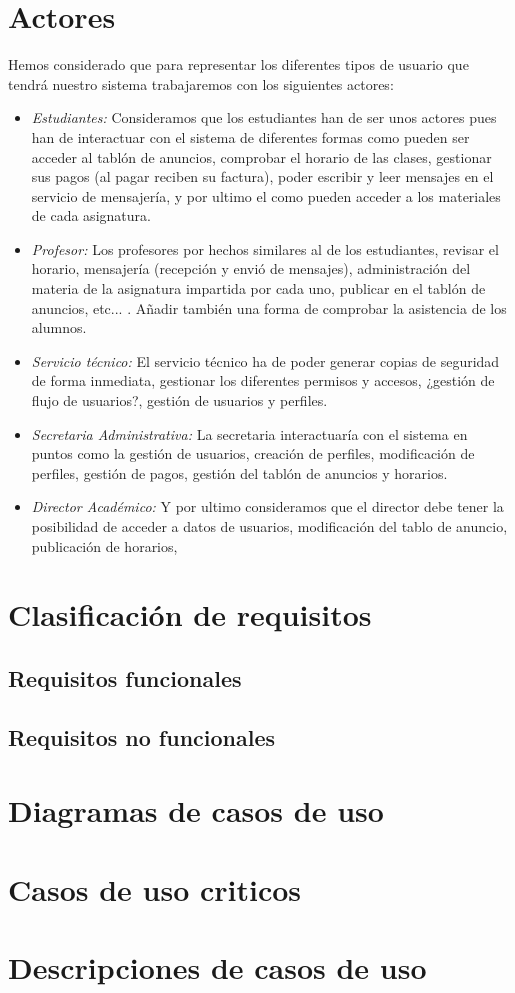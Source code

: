 \documentclass[11pt, a4paper]{article} %
\begin{document}
\section{Actores}
	Hemos considerado que para representar los diferentes tipos de usuario que tendrá nuestro sistema trabajaremos con
	los siguientes actores:
	\begin{itemize}
		\item \textit{Estudiantes:} \newline Consideramos que los estudiantes han de ser
		unos actores pues han de interactuar con el sistema de diferentes formas como pueden ser
		acceder al tablón de anuncios, comprobar el horario de las clases, gestionar sus pagos (al pagar reciben su factura),
		poder escribir y leer mensajes en el servicio de mensajería, y por ultimo el como pueden acceder a los materiales
		de cada asignatura.
		\item \textit{Profesor:} \newline Los profesores por hechos similares al de los estudiantes, revisar el horario,
		mensajería (recepción y envió de mensajes), administración del materia de la asignatura impartida por cada uno,
		publicar en el tablón de anuncios, etc... . Añadir también una forma de comprobar la asistencia de los alumnos.
		\item \textit{Servicio técnico:} \newline El servicio técnico ha de poder generar copias de seguridad de forma
		inmediata, gestionar los diferentes permisos y accesos, ¿gestión de flujo de usuarios?, gestión de usuarios y
		perfiles.
		\item \textit{Secretaria Administrativa:} \newline La secretaria interactuaría con el sistema en puntos como la
		gestión de usuarios, creación de perfiles, modificación de perfiles, gestión de pagos, gestión del tablón de
		anuncios y horarios.
		\item \textit{Director Académico:} \newline Y por ultimo consideramos que el director debe tener la posibilidad
		de acceder a datos de usuarios, modificación del tablo de anuncio, publicación de horarios,
	\end{itemize}

\section{Clasificación de requisitos}
\subsection{Requisitos funcionales}
\subsection{Requisitos no funcionales}
\section{Diagramas de casos de uso}
\section{Casos de uso criticos}

\section{Descripciones de casos de uso}
\end{document}
